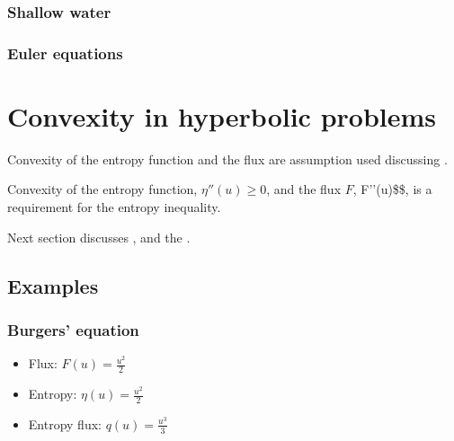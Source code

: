 \documentclass[letterpaper,10pt,english]{jupyterBook}
\begin{document}
\subsubsection{Shallow water}
\label{\detokenize{ch/pde/hyperbolic-entropy:shallow-water}}\label{\detokenize{ch/pde/hyperbolic-entropy:pde-hyperbolic-entropy-1d-system-shallow-water}}

\subsubsection{Euler equations}
\label{\detokenize{ch/pde/hyperbolic-entropy:euler-equations}}\label{\detokenize{ch/pde/hyperbolic-entropy:pde-hyperbolic-entropy-1d-system-euler}}
\sphinxstepscope


\section{Convexity in hyperbolic problems}
\label{\detokenize{ch/pde/hyperbolic-convexity:convexity-in-hyperbolic-problems}}\label{\detokenize{ch/pde/hyperbolic-convexity:pde-hyperbolic-convexity}}\label{\detokenize{ch/pde/hyperbolic-convexity::doc}}
\sphinxAtStartPar
Convexity of the entropy function and the flux are assumption used discussing {\hyperref[\detokenize{ch/pde/hyperbolic-entropy:pde-hyperbolic-entropy}]{}}.

\sphinxAtStartPar
Convexity of the entropy function, \(\eta''(u) \ge 0\), and the flux \(F\), F’’(u)\$\$, is a requirement for the entropy inequality.

\sphinxAtStartPar
Next section discusses , and the .


\subsection{Examples}
\label{\detokenize{ch/pde/hyperbolic-convexity:examples}}\subsubsection*{Burgers’ equation}
\begin{itemize}
\item {} 
\sphinxAtStartPar
Flux: \(F(u) = \frac{u^2}{2}\)

\item {} 
\sphinxAtStartPar
Entropy: \(\eta(u) = \frac{u^2}{2}\)

\item {} 
\sphinxAtStartPar
Entropy flux: \(q(u) = \frac{u^3}{3}\)

\end{itemize}
\end{document}
